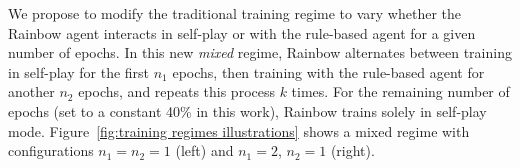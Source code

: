 \documentclass[letterpaper]{article} %
\begin{document}
We propose to modify the traditional training regime to vary whether the Rainbow agent interacts in self-play or with the rule-based agent for a given number of epochs. In this new \emph{mixed} regime, Rainbow alternates between training in self-play for the first  $n_1$ epochs, then training with the  rule-based agent for  another $n_2$ epochs, and repeats this process $k$ times.  For the remaining number of epochs (set to a constant 40\% in this work), Rainbow trains solely in self-play mode.
Figure~\ref{fig:training regimes illustrations}  shows a mixed regime   with configurations  $n_1=n_2=1$ (left) and $n_1=2$, $n_2=1$ (right).

\end{document}
